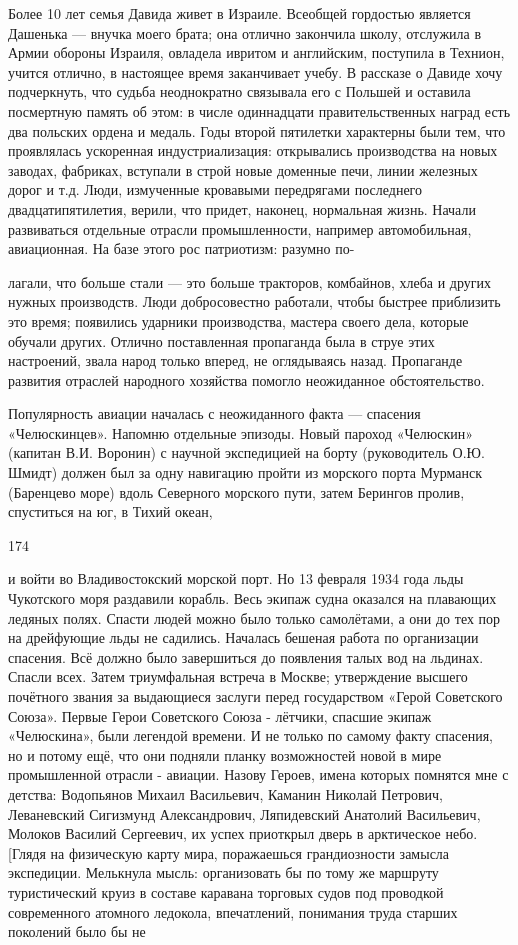 Более 10 лет семья Давида живет в Израиле. Всеобщей гордостью является Дашенька — внучка моего брата; она отлично закончила школу, отслужила в Армии обороны Израиля, овладела ивритом и английским, поступила в Технион, учится отлично, в настоящее время заканчивает учебу. В рассказе о Давиде хочу подчеркнуть, что судьба неоднократно связывала его с Польшей и оставила посмертную память об этом: в числе одиннадцати правительственных наград есть два польских ордена и медаль. Годы второй пятилетки характерны были тем, что проявлялась ускоренная индустриализация: открывались производства на новых заводах, фабриках, вступали в строй новые доменные печи, линии железных дорог и т.д. Люди, измученные кровавыми передрягами последнего двадцатипятилетия, верили, что придет, наконец, нормальная жизнь. Начали развиваться отдельные отрасли промышленности, например автомобильная, авиационная. На базе этого рос патриотизм: разумно по-

лагали, что больше стали — это больше тракторов, комбайнов, хлеба и других нужных производств. Люди добросовестно работали, чтобы быстрее приблизить это время; появились ударники производства, мастера своего дела, которые обучали других. Отлично поставленная пропаганда была в струе этих настроений, звала народ только вперед, не оглядываясь назад. Пропаганде развития отраслей народного хозяйства помогло неожиданное обстоятельство.

Популярность авиации началась с неожиданного факта — спасения «Челюскинцев». Напомню отдельные эпизоды. Новый пароход «Челюскин» (капитан В.И. Воронин) с научной экспедицией на борту (руководитель О.Ю. Шмидт) должен был за одну навигацию пройти из морского порта Мурманск (Баренцево море) вдоль Северного морского пути, затем Берингов пролив, спуститься на юг, в Тихий океан,

174

и войти во Владивостокский морской порт. Но 13 февраля 1934 года льды Чукотского моря раздавили корабль. Весь экипаж судна оказался на плавающих ледяных полях. Спасти людей можно было только самолётами, а они до тех пор на дрейфующие льды не садились. Началась бешеная работа по организации спасения. Всё должно было завершиться до появления талых вод на льдинах. Спасли всех. Затем триумфальная встреча в Москве; утверждение высшего почётного звания за выдающиеся заслуги перед государством «Герой Советского Союза». Первые Герои Советского Союза - лётчики, спасшие экипаж «Челюскина», были легендой времени. И не только по самому факту спасения, но и потому ещё, что они подняли планку возможностей новой в мире промышленной отрасли - авиации. Назову Героев, имена которых помнятся мне с детства: Водопьянов Михаил Васильевич, Каманин Николай Петрович, Леваневский Сигизмунд Александрович, Ляпидевский Анатолий Васильевич, Молоков Василий Сергеевич, их успех приоткрыл дверь в арктическое небо. [Глядя на физическую карту мира, поражаешься грандиозности замысла экспедиции. Мелькнула мысль: организовать бы по тому же маршруту туристический круиз в составе каравана торговых судов под проводкой современного атомного ледокола, впечатлений, понимания труда старших поколений было бы не

